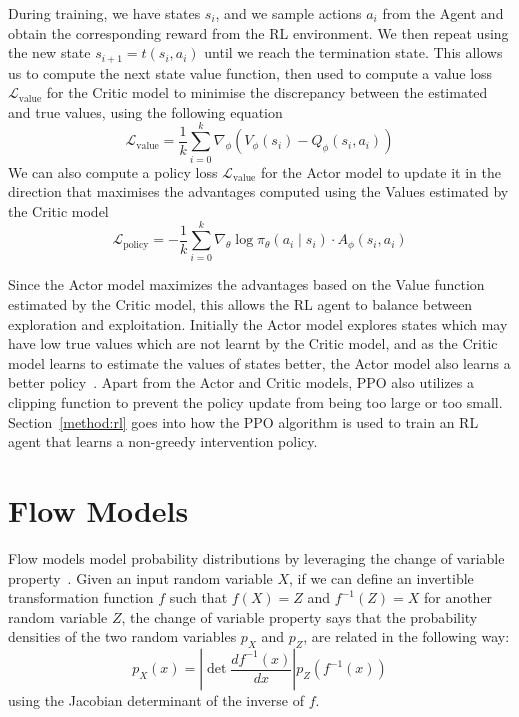 During training, we have states $s_i$, 
and we sample actions $a_i$ from the Agent
and obtain the corresponding reward
from the RL environment.
We then repeat using the new state $s_{i+1} = t(s_i, a_i)$ until we reach the termination state.
This allows us to compute 
the next state value function,
then used to compute a value loss $\mathcal{L}_{\text{value}}$ for the Critic model
to minimise the discrepancy between the estimated and true
values, using the following equation
\begin{equation}\label{equation:rl-loss}
\mathcal{L}_{\text{value}} = \frac{1}{k} \sum_{i=0}^k 
\nabla_\phi (V_\phi(s_i) - Q_\phi(s_i,a_i))
\end{equation}
We can also compute a policy loss $\mathcal{L}_{\text{value}}$ for the Actor model
to update it in the direction that maximises the advantages
computed using the Values estimated by the Critic model
\[\mathcal{L}_{\text{policy}} = -\frac{1}{k} \sum_{i = 0}^k \nabla_\theta \log
 \pi_\theta(a_i \mid s_i) \cdot A_\phi(s_i, a_i)\]

Since the Actor model
maximizes the advantages based on the Value function
estimated by the Critic model,
this allows the 
RL agent to balance between exploration and exploitation.
Initially the Actor model explores states which may have low true values
which are not learnt by the Critic model, and as the Critic model
learns to estimate the values of states better, the Actor model also 
learns a better policy~\cite{ppo}. Apart from the Actor and Critic models,
PPO also utilizes
a clipping function to prevent the policy update 
from being too large or too small.
Section~\ref{method:rl} goes into how
the PPO algorithm is used to train an RL agent that learns 
a non-greedy intervention policy.
 
\section{Flow Models}\label{background:flow}
Flow models model probability distributions by leveraging the change of variable property~\cite{normalizing-flows}.
Given an input random variable $X$,
if we can define an invertible transformation function $f$ such that
$f(X) = Z$ and $f^{-1}(Z) = X$ for another random variable $Z$,
the change of variable property says that 
the probability densities of the two random variables $p_X$ and $p_Z$,
are related in the following way:
\begin{equation}\label{equation:change-of-variable}
p_X(x) = \left | \mathop{\mathrm{det}} \frac{d f^{-1}(x)}{d x}
\right | p_Z(f^{-1}(x))
\end{equation}
using the Jacobian determinant of the inverse of $f$.

